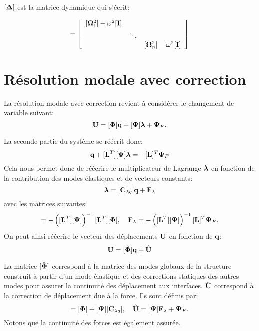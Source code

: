 \documentclass[10pt,a4paper,french]{report}
\begin{document}
$[\boldsymbol{\Delta}]$ est la matrice dynamique qui s'écrit:

\begin{equation}[\bs{\Delta}]=\left[
	\begin{array}{cccccccc}
		{[\bs{\Omega}^2_1]-\omega^2[\tb{I}]}\\
	&\ddots \\
	&&{[\bs{\Omega}^2_n]-\omega^2[\tb{I}]}
		\end{array}\right]\end{equation}


\section{Résolution modale avec correction}


La résolution modale avec correction revient à considérer le changement de variable suivant:
\begin{equation}
		\textbf{U}=[\boldsymbol{\Phi}]\textbf{q}+[\boldsymbol{\Psi}]\boldsymbol{\lambda}+\boldsymbol{\Psi}_F.
\end{equation}


La seconde partie du système  se réécrit donc:
\begin{equation}
	[\tb{L}^T][\bs{\Phi}]\tb{q}+[\tb{L}^T][\bs{\Psi}]\bs{\lambda}=-[\tb{L}]^T\bs{\Psi}_F
\end{equation}
Cela nous permet donc de réécrire le multiplicateur de Lagrange $\boldsymbol{\lambda}$ en fonction de la contribution des modes élastiques et de vecteurs constants:
\begin{equation}
\boldsymbol{\lambda}=[\textbf{C}_{\lambda q}]\textbf{q}+\textbf{F}_\lambda
\end{equation}
avec les matrices suivantes: 
\begin{equation}
	[\tb{C}_{\lambda q}]=-\left(
	[\tb{L}^T][\bs{\Psi}]
	\right)^{-1} [\tb{L}^T][\bs{\Phi}]\esp
	\tb{F}_\lambda=-\left(
	[\tb{L}^T][\bs{\Psi}]
	\right)^{-1}[\tb{L}]^T\bs{\Psi}_F.
\end{equation}
On peut ainsi réécrire le vecteur des déplacements $\textbf{U}$ en fonction de $\textbf{q}$:
\begin{equation}
\textbf{U}=[\hat{\boldsymbol{\Phi}}]\textbf{q}+\hat{\textbf{U}}
\end{equation}

La matrice $[\hat{\boldsymbol{\Phi}}]$ correspond à la matrice des modes globaux de la structure construit à partir d'un mode élastique et des corrections statiques des autres modes pour assurer la continuité des déplacement aux interfaces. $\hat{\textbf{U}}$ correspond à la correction de déplacement due à la force. Ils sont définis par: 
\begin{equation}
[\hat{\bs{\Phi}}]=
[\bs{\Phi}]+[\bs{\Psi}][\tb{C}_{\lambda q}] \esp \hat{\tb{U}}=[\bs{\Psi}]\tb{F}_{\lambda}+\bs{\Psi}_F.
\end{equation}
Notons que la continuité des forces est également assurée. \\
\end{document}
